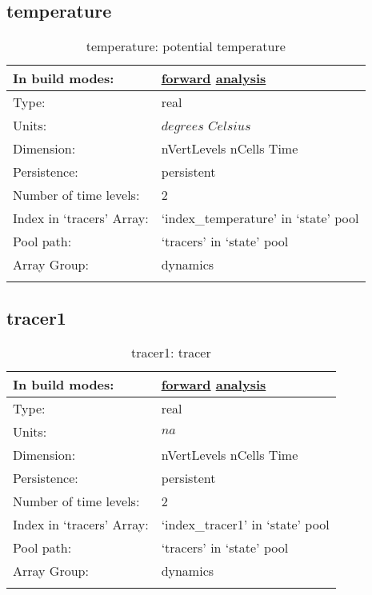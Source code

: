 \subsection[temperature]{temperature}
\label{subsec:var_sec_state_temperature}
\begin{center}
\begin{longtable}{| p{2.0in} | p{4.0in} |}
        \hline 
        In build modes: & \hyperref[subsec:forward_var_tab_state]{forward} \hyperref[subsec:analysis_var_tab_state]{analysis} \\
        \hline 
        Type: & real \\
        \hline 
        Units: & $degrees$ $Celsius$ \\
        \hline 
        Dimension: & nVertLevels nCells Time \\
        \hline 
        Persistence: & persistent \\
        \hline 
        Number of time levels: & 2 \\
        \hline 
		 Index in `tracers' Array: & `index\_temperature' in `state' pool \\
		 \hline 
            Pool path: & `tracers' in `state' pool \\
		 \hline 
		 Array Group: & dynamics \\
		 \hline 
    \caption{temperature: potential temperature}
\end{longtable}
\end{center}
\subsection[tracer1]{tracer1}
\label{subsec:var_sec_state_tracer1}
\begin{center}
\begin{longtable}{| p{2.0in} | p{4.0in} |}
        \hline 
        In build modes: & \hyperref[subsec:forward_var_tab_state]{forward} \hyperref[subsec:analysis_var_tab_state]{analysis} \\
        \hline 
        Type: & real \\
        \hline 
        Units: & $na$ \\
        \hline 
        Dimension: & nVertLevels nCells Time \\
        \hline 
        Persistence: & persistent \\
        \hline 
        Number of time levels: & 2 \\
        \hline 
		 Index in `tracers' Array: & `index\_tracer1' in `state' pool \\
		 \hline 
            Pool path: & `tracers' in `state' pool \\
		 \hline 
		 Array Group: & dynamics \\
		 \hline 
    \caption{tracer1: tracer}
\end{longtable}
\end{center}
